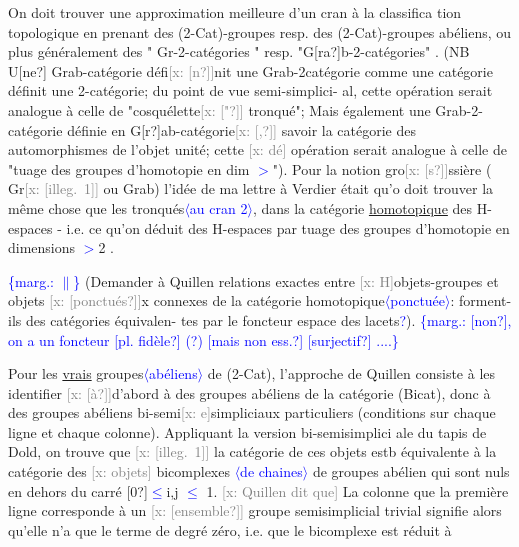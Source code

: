 \documentclass[11pt]{article}
\newcommand{\scanpage}[1]{\par\bigskip\noindent{\small\sffamily[scan #1]}\par}
\newcommand{\mspage}[1]{{\small\sffamily[p.\,#1]}}
\newcommand{\hand}[1]{\textcolor{blue}{#1}}
\let\over\relax
\newcommand{\over}[2]{\textcolor{gray}{#1}\textcolor{blue}{\ensuremath{^{\!\nearrow}}#2}}
\newcommand{\inserted}[2][]{\textcolor{blue}{$\langle$#2$\rangle$}}
\newcommand{\margin}[1]{\textcolor{blue}{\{\textsf{marg.:} #1\}}}
\newcommand{\xout}[1]{\textcolor{gray}{[\textsf{x:} #1]}}
\newcommand{\uline}[1]{\underline{#1}}
\newcommand{\unsure}[1]{[#1?]}
\newcommand{\illegible}[1]{[\textsf{illeg.\ #1}]}
\begin{document}
\mspage{\hand{38}}

\clearpage
\scanpage{162-5/39}
On doit trouver une approximation meilleure d'un cran à la classifica
tion topologique en prenant des  (2-Cat)-groupes resp. des (2-Cat)-groupes
abéliens,  ou plus généralement des " Gr-2-catégories "  resp.
"G\unsure{ra}b-2-catégories" . (NB  U\unsure{ne} Grab-catégorie défi\xout{\unsure{n}}nit une Grab-2catégorie
comme une catégorie définit une 2-catégorie; du point de vue semi-simplici-%
al, cette opération serait analogue à celle de "cosquélette\xout{\unsure{"}} tronqué";
Mais également une Grab-2-catégorie définie en G\unsure{r}ab-catégorie\xout{\unsure{,}} savoir la
catégorie des automorphismes de l'objet unité; cette \xout{dé} opération serait
analogue à celle de "tuage des groupes d'homotopie en dim \hand{$>$}\over{\unsure{1}}{1}").  Pour la
notion gro\xout{\unsure{s}}ssière ( Gr\xout{\illegible{1}} ou Grab) l'idée de ma lettre à Verdier était qu'o
doit trouver la même chose que les tronqués\inserted{au cran 2}, dans la catégorie \uline{homotopique}
des H-espaces  -  i.e. ce qu'on déduit des H-espaces par tuage des groupes
d'homotopie en dimensions \hand{$>$}2 .

\margin{$\|$} (Demander à Quillen relations exactes entre \xout{H}objets-groupes et objets
\xout{\unsure{ponctués}}x connexes de la catégorie homotopique\inserted[typed]{ponctuée}: forment-ils des catégories équivalen-%
tes par le foncteur espace des lacets\hand{?}).
\margin{\unsure{non}, on a un foncteur \unsure{pl. fidèle} (?) \unsure{mais non ess.} \unsure{surjectif} ....}

Pour les \uline{vrais} groupes\inserted[typed]{abéliens} de (2-Cat), l'approche de Quillen consiste à
les identifier \xout{\unsure{à}}d'abord à des groupes abéliens de la catégorie (Bicat),
donc à des groupes abéliens bi-semi\xout{e}simpliciaux particuliers (conditions
sur chaque ligne et chaque colonne). Appliquant la version bi-semisimplici
ale du tapis de Dold, on trouve que \xout{\illegible{1}} la catégorie de ces objets
estb équivalente à la catégorie des \xout{objets} bicomplexes \inserted[typed]{de chaines} de groupes  abélien
qui sont nuls en dehors du carré  \unsure{0}\hand{$\leq$}i,j \hand{$\leq$} 1.  \xout{Quillen dit que} La colonne
que la première ligne corresponde à un \xout{\unsure{ensemble}} groupe semisimplicial
trivial signifie alors qu'elle n'a que le terme de degré zéro, i.e. que
le bicomplexe est réduit à
\end{document}
